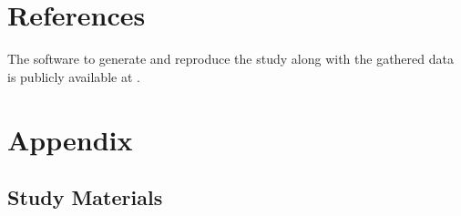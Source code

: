 \documentclass[11pt]{article}
\begin{document}

\section{References}

The software to generate and reproduce the study 
along with the gathered data is publicly available at \cite{Nair_Examining_Calibration_Large}.   




\appendix
\section{Appendix}

\subsection{Study Materials}

\label{sec:appendix}
\end{document}
